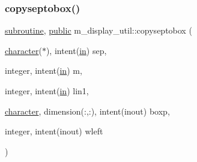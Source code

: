 \mbox{\label{namespacem__display__util_ab8090500f628c3475b88b0068c6788a4}} 
\subsubsection{\texorpdfstring{copyseptobox()}{copyseptobox()}}
{\footnotesize\ttfamily \hyperlink{M__stopwatch_83_8txt_acfbcff50169d691ff02d4a123ed70482}{subroutine}, \hyperlink{M__stopwatch_83_8txt_a2f74811300c361e53b430611a7d1769f}{public} m\+\_\+display\+\_\+util\+::copyseptobox (\begin{DoxyParamCaption}\item[{\hyperlink{option__stopwatch_83_8txt_abd4b21fbbd175834027b5224bfe97e66}{character}($\ast$), intent(\hyperlink{M__journal_83_8txt_afce72651d1eed785a2132bee863b2f38}{in})}]{sep,  }\item[{integer, intent(\hyperlink{M__journal_83_8txt_afce72651d1eed785a2132bee863b2f38}{in})}]{m,  }\item[{integer, intent(\hyperlink{M__journal_83_8txt_afce72651d1eed785a2132bee863b2f38}{in})}]{lin1,  }\item[{\hyperlink{option__stopwatch_83_8txt_abd4b21fbbd175834027b5224bfe97e66}{character}, dimension(\+:,\+:), intent(inout)}]{boxp,  }\item[{integer, intent(inout)}]{wleft }\end{DoxyParamCaption})}

\mbox{\label{namespacem__display__util_aca56756281a372cd4d186a032dd426fb}} 
